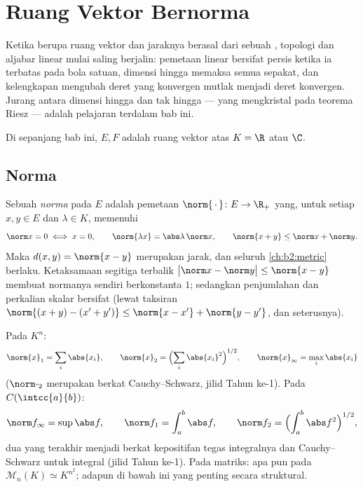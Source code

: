 \chapter{Ruang Vektor Bernorma}\label{ch:b2:nvs}

Ketika  berupa ruang vektor dan jaraknya berasal dari
sebuah , topologi dan aljabar linear mulai saling berjalin: pemetaan
linear bersifat  persis ketika ia terbatas pada bola satuan,
dimensi hingga memaksa semua  sepakat, dan kelengkapan mengubah
deret yang konvergen mutlak menjadi deret konvergen. Jurang antara
dimensi hingga dan tak hingga --- yang mengkristal pada teorema Riesz
--- adalah pelajaran terdalam bab ini.

Di sepanjang bab ini, $E, F$ adalah ruang vektor atas $K = \R$ atau $\C$.

\section{Norma}

\begin{definition}\label{def:b2:nvs:norm}
Sebuah \emph{norma} pada $E$ adalah pemetaan
$\norm{\,\cdot\,} \colon E \to \R_+$ yang, untuk setiap $x, y \in E$ dan
$\lambda \in K$, memenuhi
\[
\norm x = 0 \iff x = 0,
\qquad
\norm{\lambda x} = \abs\lambda\,\norm x,
\qquad
\norm{x + y} \leq \norm x + \norm y .
\]
Maka $d(x, y) = \norm{x - y}$ merupakan jarak, dan seluruh
\cref{ch:b2:metric} berlaku. Ketaksamaan segitiga terbalik
$\bigl|\norm x - \norm y\bigr| \leq \norm{x - y}$ membuat normanya
sendiri  berkonstanta $1$; sedangkan penjumlahan dan perkalian
skalar bersifat  (lewat taksiran $\norm{(x + y) - (x' + y')} \leq
\norm{x - x'} + \norm{y - y'}$, dan seterusnya).
\end{definition}

\begin{example}\label{ex:b2:nvs:examples}
Pada $K^n$:
\[
\norm{x}_1 = \sum_i \abs{x_i},
\qquad
\norm{x}_2 = \Bigl(\sum_i \abs{x_i}^2\Bigr)^{1/2},
\qquad
\norm{x}_\infty = \max_i \abs{x_i}
\]
($\norm\cdot_2$ merupakan  berkat Cauchy--Schwarz, jilid Tahun
ke-1). Pada $C(\intcc{a}{b})$:
\[
\norm f_\infty = \sup \abs f,
\qquad
\norm f_1 = \int_a^b \abs f,
\qquad
\norm f_2 = \Bigl(\int_a^b \abs f^2\Bigr)^{1/2},
\]
dua yang terakhir menjadi  berkat kepositifan tegas
integralnya dan Cauchy--Schwarz untuk integral (jilid Tahun ke-1). Pada
matriks:  apa pun pada $\mathcal M_n(K) \simeq K^{n^2}$; adapun
 di bawah ini yang penting secara struktural.
\end{example}

